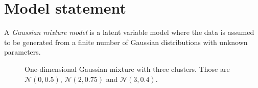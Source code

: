 \section{Model statement}

A \emph{Gaussian mixture model} is a latent variable model where the data is assumed to be generated from a finite number of Gaussian distributions with unknown parameters.

\begin{figure}[h!]
  \centering
  \caption{One-dimensional Gaussian mixture with three clusters. Those are \(\mathcal{N}(0, 0.5)\), \(\mathcal{N}(2, 0.75)\) and \(\mathcal{N}(3, 0.4)\).}
\end{figure}


